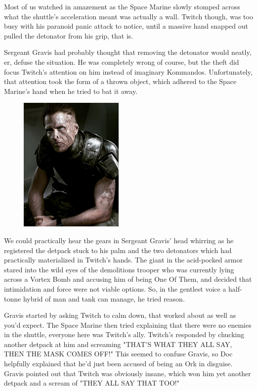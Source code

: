 Most of us watched in amazement as the Space Marine slowly stomped across what the shuttle's acceleration meant was actually a wall. 
Twitch though, was too busy with his paranoid panic attack to notice, until a massive hand snapped out pulled the detonator from his grip, that is. 


Sergeant Gravis had probably thought that removing the detonator would neatly, er, defuse the situation. 
He was completely wrong of course, but the theft did focus Twitch's attention on him instead of imaginary Kommandos. 
Unfortunately, that attention took the form of a thrown object, which adhered to the Space Marine's hand when he tried to bat it away.

\begin{figure}
	\begin{center}
		\includegraphics[width=\figwidth]{pics/12/31.png}
	\end{center}
\end{figure}
We could practically hear the gears in Sergeant Gravis' head whirring as he registered the detpack stuck to his palm and the two detonators which had practically materialized in Twitch's hands. 
The giant in the acid-pocked armor stared into the wild eyes of the demolitions trooper who was currently lying across a Vortex Bomb and accusing him of being One Of Them, and decided that intimidation and force were not viable options. 
So, in the gentlest voice a half-tonne hybrid of man and tank can manage, he tried reason.

Gravis started by asking Twitch to calm down, that worked about as well as you'd expect. 
The Space Marine then tried explaining that there were no enemies in the shuttle, everyone here was Twitch's ally. 
Twitch's responded by chucking another detpack at him and screaming "THAT'S WHAT THEY ALL SAY, THEN THE MASK COMES OFF!" This seemed to confuse Gravis, so Doc helpfully explained that he'd just been accused of being an Ork in disguise. 
Gravis pointed out that Twitch was obviously insane, which won him yet another detpack and a scream of "THEY ALL SAY THAT TOO!"

